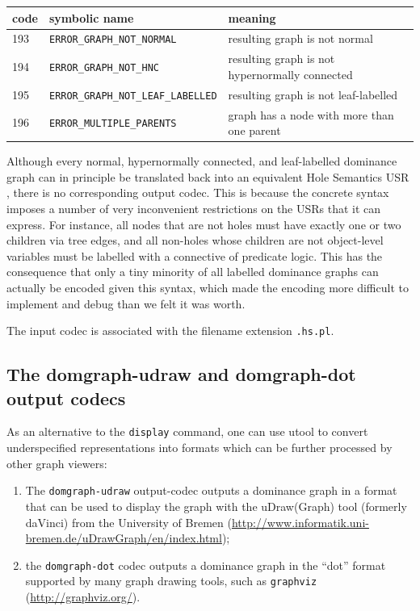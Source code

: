 \begin{tabular}{lll}
code & symbolic name & meaning \\ \hline
193 &  \verb?ERROR_GRAPH_NOT_NORMAL? & resulting graph is not normal \\
194 &  \verb?ERROR_GRAPH_NOT_HNC? & resulting graph is not hypernormally
connected \\
195 &  \verb?ERROR_GRAPH_NOT_LEAF_LABELLED? & resulting graph is not
leaf-labelled \\
196 &  \verb?ERROR_MULTIPLE_PARENTS? & graph has a node with more than one
parent 
\end{tabular}

Although every normal, hypernormally connected, and leaf-labelled
dominance graph can in principle be translated back into an equivalent
Hole Semantics USR \cite{KolNieTha03}, there is no corresponding
output codec. This is because the concrete syntax imposes a number of
very inconvenient restrictions on the USRs that it can express. For
instance, all nodes that are not holes must have exactly one or two
children via tree edges, and all non-holes whose children are not
object-level variables must be labelled with a connective of predicate
logic. This has the consequence that only a tiny minority of all
labelled dominance graphs can actually be encoded given this syntax,
which made the encoding more difficult to implement and debug than we
felt it was worth.

The input codec is associated with the filename extension \verb?.hs.pl?.




\subsection{The domgraph-udraw and domgraph-dot output codecs}

As an alternative to the \verb|display| command, one can use utool to
convert underspecified representations into formats which can be
further processed by other graph viewers:

\begin{enumerate}
\item The \verb|domgraph-udraw| output-codec outputs a dominance graph
in a format that can be used to display the graph with the
uDraw(Graph) tool (formerly daVinci) from the University of Bremen
(\url{http://www.informatik.uni-bremen.de/uDrawGraph/en/index.html}); 
\item the \verb|domgraph-dot| codec outputs a dominance graph in the
``dot'' format supported by many graph drawing tools, such as 
\verb|graphviz| (\url{http://graphviz.org/}).
\end{enumerate}

